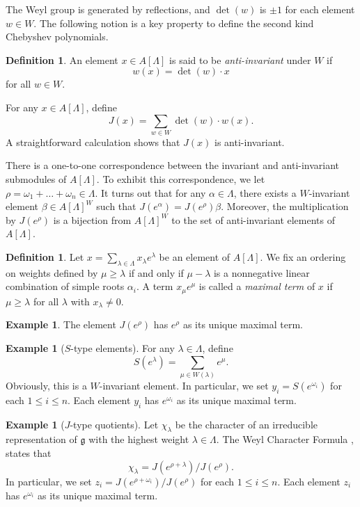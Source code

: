 \documentclass{amsart}
\newcommand{\mf}{\mathfrak}
\numberwithin{equation}{section}
\theoremstyle{plain}
\theoremstyle{definition}
\newtheorem{definition}[theorem]{Definition}
\newtheorem{example}[theorem]{Example}
\begin{document}
The Weyl group is generated by reflections, and $\det (w)$ is $\pm 1$ for each element $w\in W$. The following notion is a key property to define the second kind Chebyshev polynomials. 

\begin{definition}
An element $x \in A[\Lambda]$ is said to be \textit{anti-invariant} under $W$ if
\[w(x)= \det (w)\cdot x\]
for all $w \in W$.
\end{definition}

For any $x \in A[\Lambda]$, define 
\[J(x)=\sum_{w \in W} \det (w) \cdot w(x).\]
A straightforward calculation shows that $J(x)$ is anti-invariant. 

There is a one-to-one correspondence between the invariant and anti-invariant submodules of $A[\Lambda]$. To exhibit this correspondence, we let $\rho=\omega_1+ \ldots + \omega_n \in \Lambda$. It turns out that for any $\alpha \in \Lambda$, there exists a $W$-invariant element $\beta \in A[\Lambda]^W$ such that $J(e^{\alpha})=J(e^\rho)\beta$. Moreover, the multiplication by $J(e^\rho)$ is a bijection from $A[\Lambda]^W$ to the set of anti-invariant elements of $A[\Lambda]$.

\begin{definition}
Let $x=\sum_{\lambda \in \Lambda}x_\lambda e^\lambda$ be an element of $A[\Lambda]$. We fix an ordering on weights defined by $ \mu \geq \lambda $ if and only if $\mu - \lambda$ is a nonnegative linear combination of simple roots $\alpha_i$. A term $x_\mu e^\mu$ is called a \textit{maximal term} of $x$ if $\mu \geq \lambda$ for all $\lambda$ with $x_\lambda \neq 0$. 
\end{definition}

\begin{example}
The element $J(e^\rho)$ has $e^\rho$ as its unique maximal term. 	
\end{example}

\begin{example}[$S$-type elements]
For any $\lambda\in\Lambda$, define
$$S(e^\lambda)=\sum_{\mu \in W(\lambda)} e^\mu.$$
Obviously, this is a $W$-invariant element. In particular, we set
$y_i=S(e^{\omega_i})$ for each $1\leq i \leq n$. Each element $y_i$ has $e^{\omega_i}$ as its unique maximal term.	
\end{example}

\begin{example}[$J$-type quotients]
Let $\chi_\lambda$ be the character of an irreducible representation of $\mf{g}$ with the highest weight $\lambda \in \Lambda$. The Weyl Character Formula \cite[$\S$10.4]{hall2015}, states that
\[
\chi_\lambda=J(e^{\rho+\lambda})/J(e^\rho).
\]	
In particular, we set
$z_i=J(e^{\rho+\omega_i})/J(e^\rho)$ for each $1\leq i \leq n$. Each element $z_i$ has $e^{\omega_i}$ as its unique maximal term.
\end{example}
\end{document}
